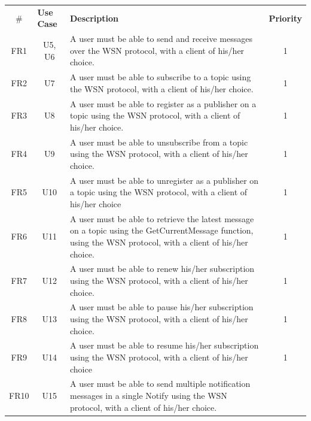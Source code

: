 \begin{longtable}{@{\extracolsep{\fill}}|l|l|p{8cm}|l|@{}}
\hline
\rowcolor{lightgray}
\multicolumn{4}{|c|}{\textbf{Functional requirements}}  \\ \hline
\multicolumn{1}{|c|}{\textbf{$\#$}} & \textbf{Use Case} & \textbf{Description}    & \textbf{Priority} \\ \hline
\multicolumn{1}{|c|}{FR1} & \multicolumn{1}{c|}{U5, U6} & A user must be able to send and receive messages over the WSN protocol, with a client of his/her choice. & 
\multicolumn{1}{c|}{1} \\ \hline
\multicolumn{1}{|c|}{FR2} & \multicolumn{1}{c|}{U7} & A user must be able to subscribe to a topic using the WSN protocol, with a client of his/her choice. &
\multicolumn{1}{c|}{1} \\ \hline
\multicolumn{1}{|c|}{FR3} & \multicolumn{1}{c|}{U8} & A user must be able to register as a publisher on a topic using the WSN protocol, with a client of his/her choice. &
\multicolumn{1}{c|}{1} \\ \hline
\multicolumn{1}{|c|}{FR4} & \multicolumn{1}{c|}{U9} & A user must be able to unsubscribe from a topic using the WSN protocol, with a client of his/her choice. &
\multicolumn{1}{c|}{1} \\ \hline
\multicolumn{1}{|c|}{FR5} & \multicolumn{1}{c|}{U10} & A user must be able to unregister as a publisher on a topic using the WSN protocol, with a client of his/her choice &
\multicolumn{1}{c|}{1} \\ \hline
\multicolumn{1}{|c|}{FR6} & \multicolumn{1}{c|}{U11} & A user must be able to retrieve the latest message on a topic using the GetCurrentMessage function, using the WSN protocol, with a client of his/her choice. &
\multicolumn{1}{c|}{1} \\ \hline
\multicolumn{1}{|c|}{FR7} & \multicolumn{1}{c|}{U12} & A user must be able to renew his/her subscription using the WSN protocol, with a client of his/her choice. &
\multicolumn{1}{c|}{1} \\ \hline
\multicolumn{1}{|c|}{FR8} & \multicolumn{1}{c|}{U13} & A user must be able to pause his/her subscription using the WSN protocol, with a client of his/her choice. &
\multicolumn{1}{c|}{1} \\ \hline
\multicolumn{1}{|c|}{FR9} & \multicolumn{1}{c|}{U14} & A user must be able to resume his/her subscription using the WSN protocol, with a client of his/her choice &
\multicolumn{1}{c|}{1} \\ \hline
\multicolumn{1}{|c|}{FR10} & \multicolumn{1}{c|}{U15} & A user must be able to send multiple notification messages in a single Notify using the WSN protocol, with a client of his/her choice. &

\end{longtable}

